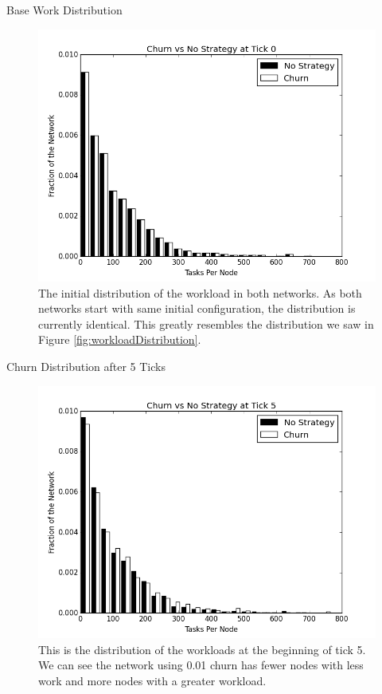 \documentclass[11pt]{beamer}
\begin{document}
\begin{frame}{Base Work Distribution}
\begin{figure}
	\centering
	\includegraphics[width=0.7\linewidth]{figs/ChurnStableHist0}
	\caption[Workload for churn at tick 0]{The initial distribution of the workload in both networks.  As both networks start with same initial configuration, the distribution is currently identical.  This greatly resembles the distribution we saw in Figure \ref{fig:workloadDistribution}.}
	
	\label{fig:churnStableHist0}
\end{figure}
\end{frame}



\begin{frame}{Churn Distribution after 5 Ticks}
\begin{figure}
	\centering
	\includegraphics[width=0.7\linewidth]{figs/ChurnStableHist5}
	\caption[Workload for churn at tick 5]{This is the distribution of the workloads at the beginning of tick 5.  We can see the network using 0.01 churn has fewer nodes with less work and more nodes with a greater workload.}
	
	\label{fig:churnStableHist5}
\end{figure}
\end{frame}
\end{document}
